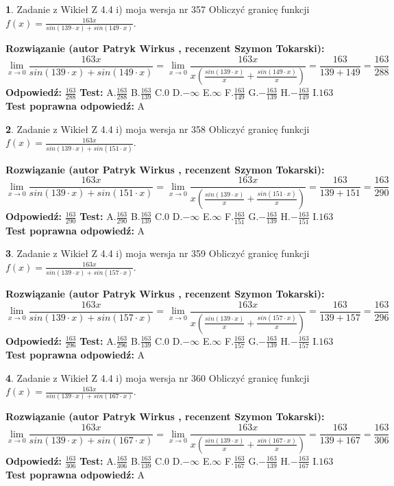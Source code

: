 \documentclass[12pt, a4paper]{article}
\theoremstyle{definition} %
\newtheorem{zad}{}
\newcommand{\zadStart}[1]{\begin{zad}#1\newline}
\newcommand{\zadStop}{\end{zad}}
\newcommand{\rozwStart}[2]{\noindent \textbf{Rozwiązanie (autor #1 , recenzent #2): }\newline}
\newcommand{\rozwStop}{\newline}
\newcommand{\odpStart}{\noindent \textbf{Odpowiedź:}\newline}
\newcommand{\odpStop}{\newline}
\newcommand{\testStart}{\noindent \textbf{Test:}\newline}
\newcommand{\testStop}{\newline}
\newcommand{\kluczStart}{\noindent \textbf{Test poprawna odpowiedź:}\newline}
\newcommand{\kluczStop}{\newline}
\begin{document}
\zadStart{Zadanie z Wikieł Z 4.4 i) moja wersja nr 357}
Obliczyć granicę funkcji $f(x)=\frac{163x}{sin(139\cdot x) +sin(149\cdot x)}$.
\zadStop
\rozwStart{Patryk Wirkus}{Szymon Tokarski}
$$\lim\limits_{x\to 0}\frac{163x}{sin(139\cdot x) +sin(149\cdot x)}=\lim\limits_{x\to 0}\frac{163x}{x(\frac{sin(139\cdot x)}{x}+\frac{sin(149\cdot x)}{x})}=\frac{163}{139+149} = \frac{163}{288}$$
\rozwStop
\odpStart
$\frac{163}{288}$
\odpStop
\testStart
A.$\frac{163}{288}$
B.$\frac{163}{139}$
C.$0$
D.$-\infty$
E.$\infty$
F.$\frac{163}{149}$
G.$-\frac{163}{139}$
H.$-\frac{163}{149}$
I.$163$
\testStop
\kluczStart
A
\kluczStop



\zadStart{Zadanie z Wikieł Z 4.4 i) moja wersja nr 358}
Obliczyć granicę funkcji $f(x)=\frac{163x}{sin(139\cdot x) +sin(151\cdot x)}$.
\zadStop
\rozwStart{Patryk Wirkus}{Szymon Tokarski}
$$\lim\limits_{x\to 0}\frac{163x}{sin(139\cdot x) +sin(151\cdot x)}=\lim\limits_{x\to 0}\frac{163x}{x(\frac{sin(139\cdot x)}{x}+\frac{sin(151\cdot x)}{x})}=\frac{163}{139+151} = \frac{163}{290}$$
\rozwStop
\odpStart
$\frac{163}{290}$
\odpStop
\testStart
A.$\frac{163}{290}$
B.$\frac{163}{139}$
C.$0$
D.$-\infty$
E.$\infty$
F.$\frac{163}{151}$
G.$-\frac{163}{139}$
H.$-\frac{163}{151}$
I.$163$
\testStop
\kluczStart
A
\kluczStop



\zadStart{Zadanie z Wikieł Z 4.4 i) moja wersja nr 359}
Obliczyć granicę funkcji $f(x)=\frac{163x}{sin(139\cdot x) +sin(157\cdot x)}$.
\zadStop
\rozwStart{Patryk Wirkus}{Szymon Tokarski}
$$\lim\limits_{x\to 0}\frac{163x}{sin(139\cdot x) +sin(157\cdot x)}=\lim\limits_{x\to 0}\frac{163x}{x(\frac{sin(139\cdot x)}{x}+\frac{sin(157\cdot x)}{x})}=\frac{163}{139+157} = \frac{163}{296}$$
\rozwStop
\odpStart
$\frac{163}{296}$
\odpStop
\testStart
A.$\frac{163}{296}$
B.$\frac{163}{139}$
C.$0$
D.$-\infty$
E.$\infty$
F.$\frac{163}{157}$
G.$-\frac{163}{139}$
H.$-\frac{163}{157}$
I.$163$
\testStop
\kluczStart
A
\kluczStop



\zadStart{Zadanie z Wikieł Z 4.4 i) moja wersja nr 360}
Obliczyć granicę funkcji $f(x)=\frac{163x}{sin(139\cdot x) +sin(167\cdot x)}$.
\zadStop
\rozwStart{Patryk Wirkus}{Szymon Tokarski}
$$\lim\limits_{x\to 0}\frac{163x}{sin(139\cdot x) +sin(167\cdot x)}=\lim\limits_{x\to 0}\frac{163x}{x(\frac{sin(139\cdot x)}{x}+\frac{sin(167\cdot x)}{x})}=\frac{163}{139+167} = \frac{163}{306}$$
\rozwStop
\odpStart
$\frac{163}{306}$
\odpStop
\testStart
A.$\frac{163}{306}$
B.$\frac{163}{139}$
C.$0$
D.$-\infty$
E.$\infty$
F.$\frac{163}{167}$
G.$-\frac{163}{139}$
H.$-\frac{163}{167}$
I.$163$
\testStop
\kluczStart
A
\kluczStop
\end{document}
